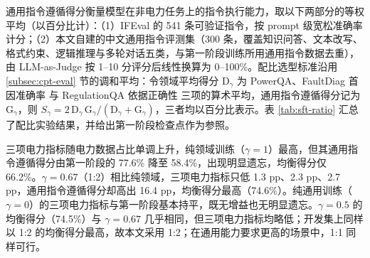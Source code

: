 \documentclass[fontset=fandol,type=master,campus=shenzhen,etitleauto=true]{hithesisbook}
\begin{document}
通用指令遵循得分衡量模型在非电力任务上的指令执行能力，取以下两部分的等权平均（以百分比计）：（1）IFEval\cite{ref85} 的 541 条可验证指令，按 prompt 级宽松准确率计分；（2）本文自建的中文通用指令评测集（300 条，覆盖知识问答、文本改写、格式约束、逻辑推理与多轮对话五类，与第一阶段训练所用通用指令数据去重），由 LLM-as-Judge 按 1--10 分评分后线性换算为 0--100\%。配比选型标准沿用 \ref{subsec:cpt-eval} 节的调和平均：令领域平均得分 $\text{D}_\gamma$ 为 PowerQA、FaultDiag 首因准确率 与 RegulationQA 依据正确性 三项的算术平均，通用指令遵循得分记为 $\text{G}_\gamma$，则 $S_\gamma = 2\,\text{D}_\gamma\,\text{G}_\gamma / (\text{D}_\gamma + \text{G}_\gamma)$，三者均以百分比表示。表 \ref{tab:sft-ratio} 汇总了配比实验结果，并给出第一阶段检查点作为参照。

\begin{table}[htbp]
\centering
\caption{SFT 第二阶段通用-领域数据配比实验结果}
\label{tab:sft-ratio}
\small
\setlength{\tabcolsep}{4pt}
\end{table}

三项电力指标随电力数据占比单调上升，纯领域训练（$\gamma = 1$）最高，但其通用指令遵循得分由第一阶段的 77.6\% 降至 58.4\%，出现明显遗忘，均衡得分仅 66.2\%。$\gamma = 0.67$（1:2）相比纯领域，三项电力指标只低 1.3 pp、2.3 pp、2.7 pp，通用指令遵循得分却高出 16.4 pp，均衡得分最高（74.6\%）。纯通用训练（$\gamma = 0$）的三项电力指标与第一阶段基本持平，既无增益也无明显遗忘。$\gamma = 0.5$ 的均衡得分（74.5\%）与 $\gamma = 0.67$ 几乎相同，但三项电力指标均略低；开发集上同样以 1:2 的均衡得分最高，故本文采用 1:2；在通用能力要求更高的场景中，1:1 同样可行。
\end{document}
